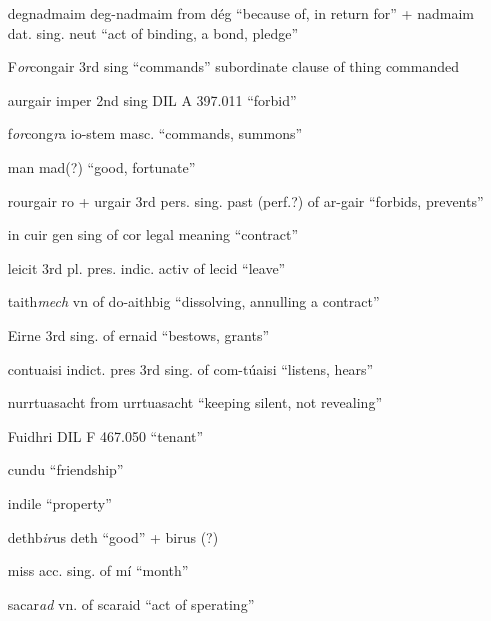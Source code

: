 \documentclass[11pt]{article}
\begin{document}
\begin{enumerate}
  \item[degnadmaim] deg-nadmaim from d\'{e}g \enquote{because of, in return for} + nadmaim dat. sing. neut \enquote{act of binding, a bond, pledge}

  \item[F\emph{or}congair] 3rd sing \enquote{commands} subordinate clause of thing commanded

  \item[aurgair] imper 2nd sing DIL A 397.011 \enquote{forbid}

  \item[f\emph{or}cong\emph{r}a] io-stem masc. \enquote{commands, summons}

  \item[man] mad(?) \enquote{good, fortunate}

  \item[rourgair] ro + urgair 3rd pers. sing. past (perf.?) of ar-gair \enquote{forbids, prevents}

  \item[in cuir] gen sing of cor legal meaning \enquote{contract}

  \item[leicit] 3rd pl. pres. indic. activ of lecid \enquote{leave}

  \item[taith\emph{mech}] vn of do-aithbig \enquote{dissolving, annulling a contract}

  \item[Eirne] 3rd sing. of ernaid \enquote{bestows, grants}

  \item[contuaisi] indict. pres 3rd sing. of com-t\'{u}aisi \enquote{listens, hears}

  \item[nurrtuasacht] from urrtuasacht \enquote{keeping silent, not revealing}

  \item[Fuidhri] DIL F 467.050 \enquote{tenant}

  \item[cundu] \enquote{friendship}

  \item[indile] \enquote{property}
    
  \item[dethb\emph{ir}us] deth \enquote{good} + birus (?)

  \item[miss] acc. sing. of m\'{i} \enquote{month}

  \item[sacar\emph{ad}] vn. of scaraid \enquote{act of sperating}


\end{enumerate}
\end{document}
